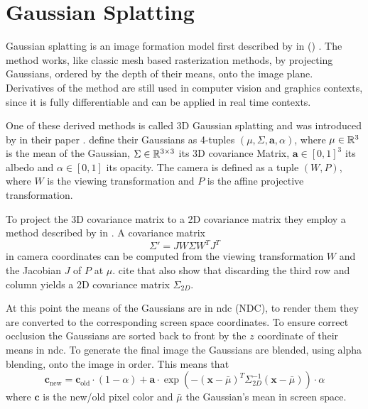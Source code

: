 \documentclass[a4paper, 11pt]{memoir}
\begin{document}
    \section{Gaussian Splatting}
    \label{sec:splatting}
    Gaussian splatting is an image formation model first described by \citeauthor{splatting} in 
    (\citeyear{splatting}) \cite{splatting}. The method works, like classic mesh based rasterization methods, by projecting
    Gaussians, ordered by the depth of their means, onto the image plane. Derivatives of the method are still used in computer vision
    and graphics contexts, since it is fully differentiable and can be applied in real time contexts.

    One of these derived methods is called 3D Gaussian splatting and was introduced by \citeauthor{kerbl3Dgaussians} in
    their \citeyear{kerbl3Dgaussians} paper \cite{kerbl3Dgaussians}. \citeauthor{kerbl3Dgaussians}
    define their Gaussians as 4-tuples $(\mu, \Sigma, \mathbf{a}, \alpha)$, where $\mu \in \mathbb{R}^3$ is the mean of the
    Gaussian, $\Sigma \in \mathbb{R}^{3\times 3}$ its 3D covariance Matrix, $\mathbf{a} \in [0, 1]^3$ its albedo and
    $\alpha \in [0, 1]$ its opacity. The camera is defined as a tuple $(W, P)$, where $W$ is the viewing transformation
    and $P$ is the affine projective transformation.

    To project the 3D covariance matrix to a 2D covariance matrix they employ a method described by \citeauthor{volume_splatting}
    in \cite{volume_splatting}. A covariance matrix
    \begin{equation}
        \Sigma' = JW\Sigma W^TJ^T
    \end{equation}
    in camera coordinates can be computed from the viewing transformation $W$ and the Jacobian $J$ of $P$ at $\mu$.
    \citeauthor{kerbl3Dgaussians} cite that \citeauthor{volume_splatting} also show that discarding the third row and
    column yields a 2D covariance matrix $\Sigma_{2D}$.

    At this point the means of the Gaussians are in \gls{ndc} (NDC), to render them they are converted to the corresponding
    screen space coordinates. To ensure correct occlusion the Gaussians are sorted back to front by the $z$ coordinate of
    their means in \gls{ndc}. To generate the final image the Gaussians are blended, using alpha blending, onto the image
    in order. This means that
    \begin{equation}
        \mathbf{c}_{\text{new}} = \mathbf{c}_{\text{old}} \cdot (1 - \alpha) + \mathbf{a} \cdot \exp{\left(-(\mathbf{x} - \bar{\mu})^T\Sigma_{2D}^{-1}(\mathbf{x} - \bar{\mu})\right)} \cdot \alpha
    \end{equation}
    where $\mathbf{c}$ is the new/old pixel color and $\bar{\mu}$ the Gaussian's mean in screen space.
\end{document}
